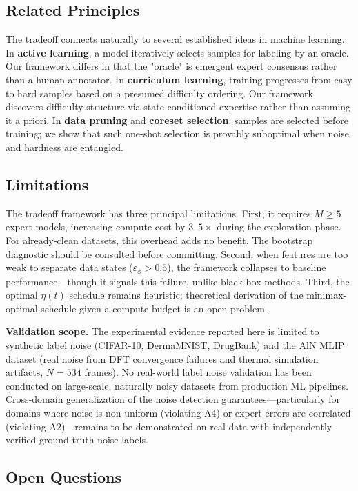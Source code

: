 \documentclass[12pt,a4paper]{article}
\begin{document}
\subsection*{Related Principles}

The tradeoff connects naturally to several established ideas in machine learning. In \textbf{active learning}, a model iteratively selects samples for labeling by an oracle. Our framework differs in that the "oracle" is emergent expert consensus rather than a human annotator. In \textbf{curriculum learning}, training progresses from easy to hard samples based on a presumed difficulty ordering. Our framework discovers difficulty structure via state-conditioned expertise rather than assuming it a priori. In \textbf{data pruning} and \textbf{coreset selection}, samples are selected before training; we show that such one-shot selection is provably suboptimal when noise and hardness are entangled.

\subsection*{Limitations}

The tradeoff framework has three principal limitations. First, it requires $M \geq 5$ expert models, increasing compute cost by $3$--$5\times$ during the exploration phase. For already-clean datasets, this overhead adds no benefit. The bootstrap diagnostic should be consulted before committing. Second, when features are too weak to separate data states ($\varepsilon_\phi > 0.5$), the framework collapses to baseline performance---though it signals this failure, unlike black-box methods. Third, the optimal $\eta(t)$ schedule remains heuristic; theoretical derivation of the minimax-optimal schedule given a compute budget is an open problem.

\textbf{Validation scope.} The experimental evidence reported here is limited to synthetic label noise (CIFAR-10, DermaMNIST, DrugBank) and the AlN MLIP dataset (real noise from DFT convergence failures and thermal simulation artifacts, $N=534$ frames). No real-world label noise validation has been conducted on large-scale, naturally noisy datasets from production ML pipelines. Cross-domain generalization of the noise detection guarantees---particularly for domains where noise is non-uniform (violating A4) or expert errors are correlated (violating A2)---remains to be demonstrated on real data with independently verified ground truth noise labels.

\subsection*{Open Questions}
\end{document}
